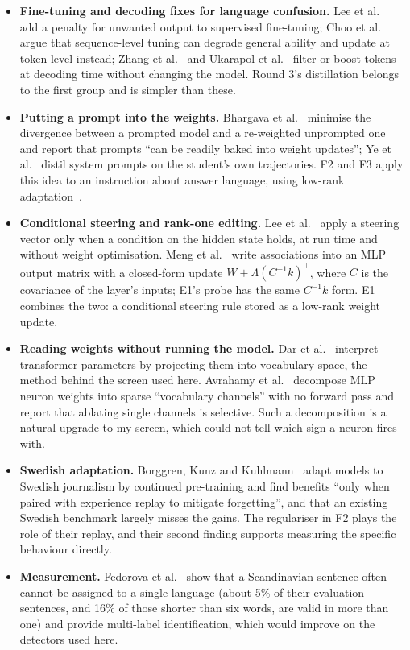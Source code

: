 \documentclass[10pt,a4paper]{article}
\begin{document}
\begin{itemize}
\item \textbf{Fine-tuning and decoding fixes for language confusion.} Lee et al.~\cite{lee2025} add a penalty for unwanted output to supervised fine-tuning; Choo et al.~\cite{choo2026} argue that sequence-level tuning can degrade general ability and update at token level instead; Zhang et al.~\cite{zhang2025} and Ukarapol et al.~\cite{ukarapol2026} filter or boost tokens at decoding time without changing the model. Round 3's distillation belongs to the first group and is simpler than these.
\item \textbf{Putting a prompt into the weights.} Bhargava et al.~\cite{bhargava2024} minimise the divergence between a prompted model and a re-weighted unprompted one and report that prompts ``can be readily baked into weight updates''; Ye et al.~\cite{ye2026} distil system prompts on the student's own trajectories. F2 and F3 apply this idea to an instruction about answer language, using low-rank adaptation~\cite{hu2021}.
\item \textbf{Conditional steering and rank-one editing.} Lee et al.~\cite{leecast2024} apply a steering vector only when a condition on the hidden state holds, at run time and without weight optimisation. Meng et al.~\cite{meng2022rome,meng2022memit} write associations into an MLP output matrix with a closed-form update $W + \Lambda (C^{-1}k)^{\top}$, where $C$ is the covariance of the layer's inputs; E1's probe has the same $C^{-1}k$ form. E1 combines the two: a conditional steering rule stored as a low-rank weight update.
\item \textbf{Reading weights without running the model.} Dar et al.~\cite{dar2022} interpret transformer parameters by projecting them into vocabulary space, the method behind the screen used here. Avrahamy et al.~\cite{avrahamy2026} decompose MLP neuron weights into sparse ``vocabulary channels'' with no forward pass and report that ablating single channels is selective. Such a decomposition is a natural upgrade to my screen, which could not tell which sign a neuron fires with.
\item \textbf{Swedish adaptation.} Borggren, Kunz and Kuhlmann~\cite{borggren2026} adapt models to Swedish journalism by continued pre-training and find benefits ``only when paired with experience replay to mitigate forgetting'', and that an existing Swedish benchmark largely misses the gains. The regulariser in F2 plays the role of their replay, and their second finding supports measuring the specific behaviour directly.
\item \textbf{Measurement.} Fedorova et al.~\cite{fedorova2025} show that a Scandinavian sentence often cannot be assigned to a single language (about 5\% of their evaluation sentences, and 16\% of those shorter than six words, are valid in more than one) and provide multi-label identification, which would improve on the detectors used here.
\end{itemize}
\end{document}
